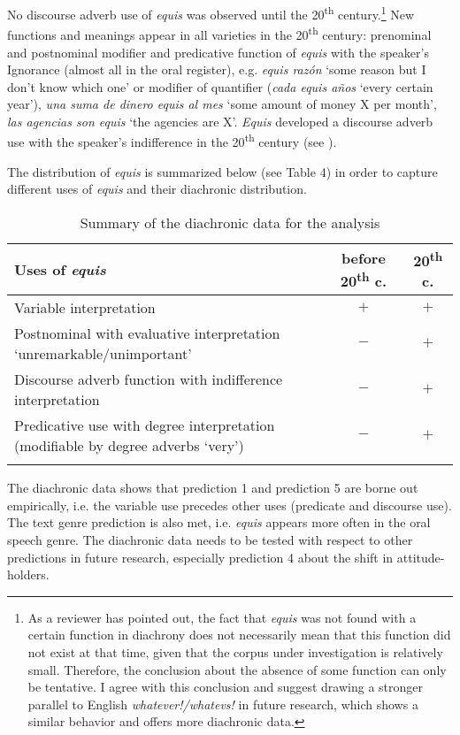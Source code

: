 \documentclass[output=paper]{langsci/langscibook}
\begin{document}
No discourse adverb use of \textit{equis} was observed until the 20\textsuperscript{th} century.\footnote{As a reviewer has pointed out, the fact that \textit{equis} was not found with a certain function in diachrony does not necessarily mean that this function did not exist at that time, given that the corpus under investigation is relatively small. Therefore, the conclusion about the absence of some function can only be tentative. I agree with this conclusion and suggest drawing a stronger parallel to English \textit{whatever!/whatevs!} in future research, which shows a similar behavior and offers more diachronic data.}
New functions and meanings appear in all varieties in the 20\textsuperscript{th} century: prenominal and postnominal modifier and predicative function of \textit{equis} with the speaker’s Ignorance (almost all in the oral register), e.g. \textit{equis razón} ‘some reason but I don’t know which one’ or modifier of quantifier (\textit{cada equis años} ‘every certain year’), \textit{una suma de dinero equis al mes} ‘some amount of money X per month’, \textit{las agencias son equis} ‘the agencies are X’. \textit{Equis} developed a discourse adverb use with the speaker’s indifference in the 20\textsuperscript{th} century (see ).

The distribution of \textit{equis} is summarized below (see Table 4) in order to capture different uses of \textit{equis} and their diachronic distribution.

\begin{table}
\caption{Summary of the diachronic data for the analysis\label{tab:4:Summary}}
 \begin{tabularx}{\textwidth}{Qcc}
  \lsptoprule
    Uses of \textit{equis} & before 20\textsuperscript{th} c. & 20\textsuperscript{th} c.\\
  \midrule
   Variable interpretation & $+$ & $+$\\\tablevspace
   Postnominal with evaluative interpretation ‘unremarkable/unimportant’ & $-$ & $+$\\\tablevspace
   Discourse adverb function with  indifference interpretation & $-$ & $+$\\\tablevspace
   Predicative use with degree interpretation (modifiable by degree adverbs ‘very’) & $-$ & $+$\\
  \lspbottomrule
 \end{tabularx}
\end{table}

The diachronic data shows that prediction 1 and prediction 5 are borne out empirically, i.e. the variable use precedes other uses (predicate and discourse use). The text genre prediction is also met, i.e. \textit{equis} appears more often in the oral speech genre. The diachronic data needs to be tested with respect to other predictions in future research, especially prediction 4 about the shift in attitude-holders.
\end{document}
